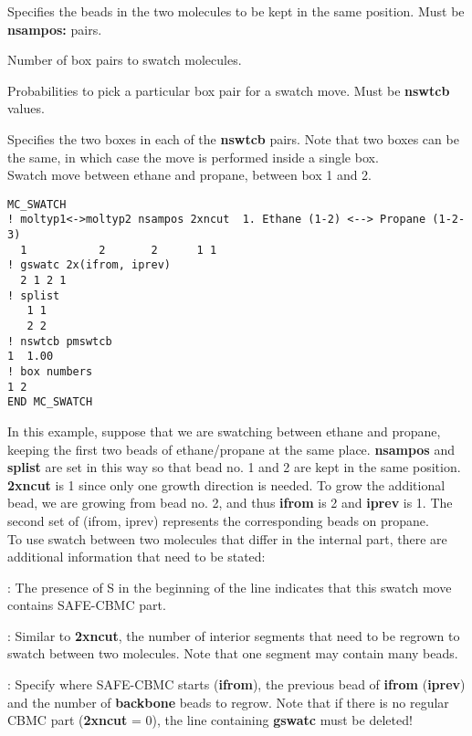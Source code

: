 \documentclass[12pt,letterpaper]{article}
\begin{document}
 Specifies the beads in the two
molecules to be kept in the same position. Must be {\bf
  nsampos:} pairs.

 Number of box pairs to swatch molecules.

 Probabilities to pick a particular
box pair for a swatch move. Must be {\bf nswtcb} values.

 Specifies the two boxes in each
of the {\bf nswtcb} pairs. Note that two boxes can be the
same, in which case the move is performed inside a single
box. \\

\hfill\break
Swatch move between ethane and propane, between box 1 and 2.

\begin{verbatim}
MC_SWATCH
! moltyp1<->moltyp2 nsampos 2xncut  1. Ethane (1-2) <--> Propane (1-2-3)
  1           2       2      1 1
! gswatc 2x(ifrom, iprev)
  2 1 2 1
! splist
   1 1
   2 2
! nswtcb pmswtcb
1  1.00
! box numbers
1 2
END MC_SWATCH
\end{verbatim}

\noindent In this example, suppose that we are swatching between ethane and propane, keeping the first two beads of ethane/propane at the same place. {\bf nsampos} and {\bf splist} are set in this way so that bead no. 1 and 2 are kept in the same position. {\bf 2xncut} is 1 since only one growth direction is needed. To grow the additional bead, we are growing from bead no. 2, and thus {\bf ifrom} is 2 and {\bf iprev} is 1. The second set of (ifrom, iprev) represents the corresponding beads on propane. \\

\noindent To use swatch between two molecules that differ in the internal part, there are additional information that need to be stated:

: The presence of S in the beginning of the line indicates that this swatch move contains SAFE-CBMC part.

: Similar to {\bf 2xncut}, the number of interior segments that need to be regrown to swatch between two molecules. Note that one segment may contain many beads.

: Specify where SAFE-CBMC starts ({\bf ifrom}), the previous bead of {\bf ifrom} ({\bf iprev}) and the number of {\bf backbone} beads to regrow. Note that if there is no regular CBMC part ({\bf 2xncut} = 0), the line containing {\bf gswatc} must be deleted!  
\end{document}
